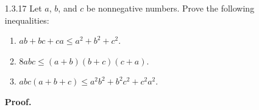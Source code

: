 \begin{enumerate}
      \textbf{Proof.} Let $a$ and $b$ be real numbers and let $n$ be a natural
      number. Applying Cauchy's Inequality(from Exercise 1.3.15) to $\sqrt{n}a$ 
      and $b/\sqrt{n}$ will lead us to conclude
      $$ab \le \frac{1}{2}(na^2 + \frac{1}{n}b^2).$$ \qed
   \item[1.3.17]  Let $a$, $b$, and $c$ be nonnegative numbers. Prove the
                  following inequalities:
                  \begin{enumerate}
                     \item $ab + bc + ca \le a^2 + b^2 + c^2$.
                     \item $8abc \le (a + b)(b + c)(c + a)$.
                     \item $abc(a + b + c) \le a^2b^2 + b^2c^2 + c^2a^2$.
                  \end{enumerate}

      \textbf{Proof.}


\end{enumerate}

